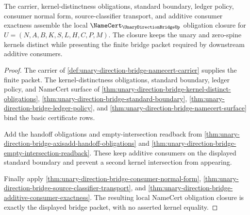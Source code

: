 \begin{theorem}
\label{thm:unary-direction-bridge-namecert-obligation-closure}
The carrier, kernel-distinctness obligations, standard boundary, ledger policy, consumer normal form, source-classifier transport, and additive consumer exactness assemble the local $\NameCert_{\UnaryDirectionBridgeUp}$ obligation closure for $U=(N,A,B,K,S,L,H,C,P,M)$. The closure keeps the unary and zero-spine kernels distinct while presenting the finite bridge packet required by downstream additive consumers.
\end{theorem}
\begin{proof}
The carrier of \autoref{def:unary-direction-bridge-namecert-carrier} supplies the finite packet. The kernel-distinctness obligations, standard boundary, ledger policy, and NameCert surface of \autoref{thm:unary-direction-bridge-kernel-distinct-obligations}, \autoref{thm:unary-direction-bridge-standard-boundary}, \autoref{thm:unary-direction-bridge-ledger-policy}, and \autoref{thm:unary-direction-bridge-namecert-surface} bind the basic certificate rows.

Add the handoff obligations and empty-intersection readback from \autoref{thm:unary-direction-bridge-axisadd-handoff-obligations} and \autoref{thm:unary-direction-bridge-empty-intersection-readback}. These keep additive consumers on the displayed standard boundary and prevent a second kernel intersection from appearing.

Finally apply \autoref{thm:unary-direction-bridge-consumer-normal-form}, \autoref{thm:unary-direction-bridge-source-classifier-transport}, and \autoref{thm:unary-direction-bridge-additive-consumer-exactness}. The resulting local NameCert obligation closure is exactly the displayed bridge packet, with no asserted kernel equality.
\end{proof}

